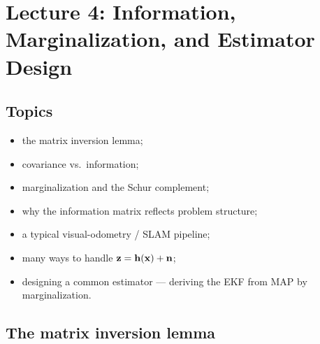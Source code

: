 \section{Lecture 4: Information, Marginalization, and Estimator Design}
\label{sec:lecture04}

\subsection{Topics}
\begin{itemize}[itemsep=0.3em]
\item the matrix inversion lemma;
\item covariance vs.\ information;
\item marginalization and the Schur complement;
\item why the information matrix reflects problem structure;
\item a typical visual-odometry / SLAM pipeline;
\item many ways to handle $\boldsymbol{\mathbf{z}}=\boldsymbol{\mathbf{h}}(\boldsymbol{\mathbf{x}})+\boldsymbol{\mathbf{n}}$;
\item designing a common estimator --- deriving the EKF from MAP by marginalization.
\end{itemize}

\setlength{\arraycolsep}{3.5pt}

\subsection{The matrix inversion lemma}

